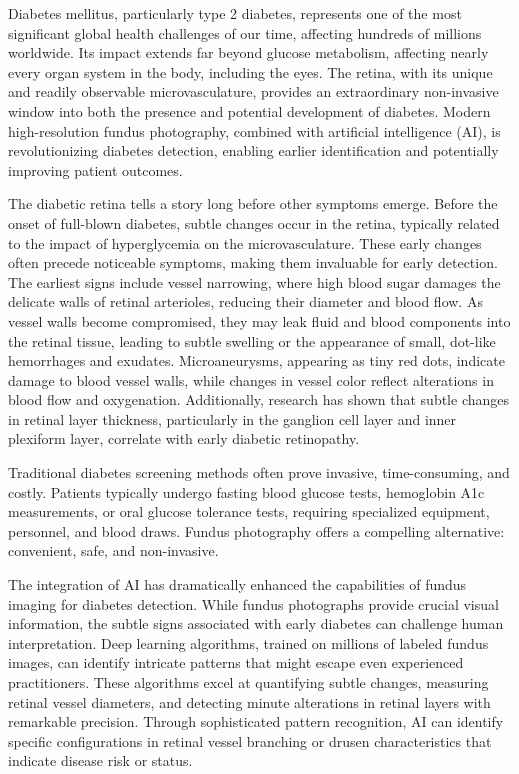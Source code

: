 \documentclass[
  Letterpaper,
]{scrbook}
\begin{document}
Diabetes mellitus, particularly type 2 diabetes, represents one of the
most significant global health challenges of our time, affecting
hundreds of millions worldwide. Its impact extends far beyond glucose
metabolism, affecting nearly every organ system in the body, including
the eyes. The retina, with its unique and readily observable
microvasculature, provides an extraordinary non-invasive window into
both the presence and potential development of diabetes. Modern
high-resolution fundus photography, combined with artificial
intelligence (AI), is revolutionizing diabetes detection, enabling
earlier identification and potentially improving patient outcomes.

The diabetic retina tells a story long before other symptoms emerge.
Before the onset of full-blown diabetes, subtle changes occur in the
retina, typically related to the impact of hyperglycemia on the
microvasculature. These early changes often precede noticeable symptoms,
making them invaluable for early detection. The earliest signs include
vessel narrowing, where high blood sugar damages the delicate walls of
retinal arterioles, reducing their diameter and blood flow. As vessel
walls become compromised, they may leak fluid and blood components into
the retinal tissue, leading to subtle swelling or the appearance of
small, dot-like hemorrhages and exudates. Microaneurysms, appearing as
tiny red dots, indicate damage to blood vessel walls, while changes in
vessel color reflect alterations in blood flow and oxygenation.
Additionally, research has shown that subtle changes in retinal layer
thickness, particularly in the ganglion cell layer and inner plexiform
layer, correlate with early diabetic retinopathy.

Traditional diabetes screening methods often prove invasive,
time-consuming, and costly. Patients typically undergo fasting blood
glucose tests, hemoglobin A1c measurements, or oral glucose tolerance
tests, requiring specialized equipment, personnel, and blood draws.
Fundus photography offers a compelling alternative: convenient, safe,
and non-invasive.

The integration of AI has dramatically enhanced the capabilities of
fundus imaging for diabetes detection. While fundus photographs provide
crucial visual information, the subtle signs associated with early
diabetes can challenge human interpretation. Deep learning algorithms,
trained on millions of labeled fundus images, can identify intricate
patterns that might escape even experienced practitioners. These
algorithms excel at quantifying subtle changes, measuring retinal vessel
diameters, and detecting minute alterations in retinal layers with
remarkable precision. Through sophisticated pattern recognition, AI can
identify specific configurations in retinal vessel branching or drusen
characteristics that indicate disease risk or status.
\end{document}
